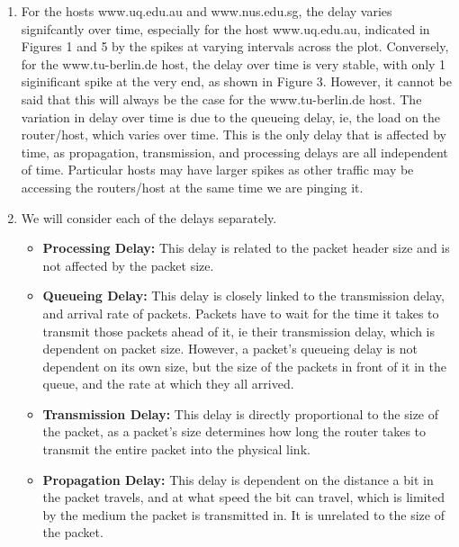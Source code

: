 \documentclass[a4paper,11pt]{article}
\begin{document}
\begin{enumerate}[leftmargin=*]
		\pagebreak
	\item For the hosts www.uq.edu.au and www.nus.edu.sg, the delay varies signifcantly over time, especially for the host www.uq.edu.au, indicated in Figures 1 and 5 by the spikes at varying intervals across the plot. Conversely, for the www.tu-berlin.de host, the delay over time is very stable, with only 1 siginificant spike at the very end, as shown in Figure 3. However, it cannot be said that this will always be the case for the www.tu-berlin.de host. The variation in delay over time is due to the queueing delay, ie, the load on the router/host, which varies over time. This is the only delay that is affected by time, as propagation, transmission, and processing delays are all independent of time. Particular hosts may have larger spikes as other traffic may be accessing the routers/host at the same time we are pinging it. 
	\item We will consider each of the delays separately.
		\begin{itemize}
			\item \textbf{Processing Delay:} This delay is related to the packet header size and is not affected by the packet size.
			\item \textbf{Queueing Delay:} This delay is closely linked to the transmission delay, and arrival rate of packets. Packets have to wait for the time it takes to transmit those packets ahead of it, ie their transmission delay, which is dependent on packet size. However, a packet's queueing delay is not dependent on its own size, but the size of the packets in front of it in the queue, and the rate at which they all arrived.
			\item \textbf{Transmission Delay:} This delay is directly proportional to the size of the packet, as a packet's size determines how long the router takes to transmit the entire packet into the physical link.
			\item \textbf{Propagation Delay:} This delay is dependent on the distance a bit in the  packet travels, and at what speed the bit can travel, which is limited by the medium the packet is transmitted in. It is unrelated to the size of the packet.
		\end{itemize}
\end{enumerate}
\end{document}
